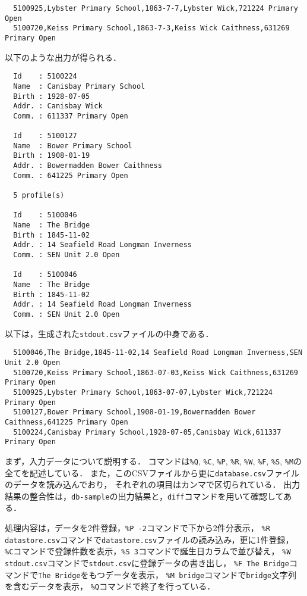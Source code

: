 \documentclass[autodetect-engine,dvi=dvipdfmx,ja=standard,
               a4j,11pt]{bxjsarticle}
\begin{document}
{\fontsize{10pt}{11pt} \selectfont
 \begin{verbatim}
  5100925,Lybster Primary School,1863-7-7,Lybster Wick,721224 Primary Open
  5100720,Keiss Primary School,1863-7-3,Keiss Wick Caithness,631269 Primary Open
 \end{verbatim}
}

\noindent
以下のような出力が得られる．

{\fontsize{10pt}{11pt} \selectfont
 \begin{verbatim}
  Id    : 5100224
  Name  : Canisbay Primary School
  Birth : 1928-07-05
  Addr. : Canisbay Wick
  Comm. : 611337 Primary Open

  Id    : 5100127
  Name  : Bower Primary School
  Birth : 1908-01-19
  Addr. : Bowermadden Bower Caithness
  Comm. : 641225 Primary Open

  5 profile(s)

  Id    : 5100046
  Name  : The Bridge
  Birth : 1845-11-02
  Addr. : 14 Seafield Road Longman Inverness
  Comm. : SEN Unit 2.0 Open

  Id    : 5100046
  Name  : The Bridge
  Birth : 1845-11-02
  Addr. : 14 Seafield Road Longman Inverness
  Comm. : SEN Unit 2.0 Open
 \end{verbatim}
}

\noindent
以下は，生成された\verb|stdout.csv|ファイルの中身である．

{\fontsize{10pt}{11pt} \selectfont
 \begin{verbatim}
  5100046,The Bridge,1845-11-02,14 Seafield Road Longman Inverness,SEN Unit 2.0 Open
  5100720,Keiss Primary School,1863-07-03,Keiss Wick Caithness,631269 Primary Open
  5100925,Lybster Primary School,1863-07-07,Lybster Wick,721224 Primary Open
  5100127,Bower Primary School,1908-01-19,Bowermadden Bower Caithness,641225 Primary Open
  5100224,Canisbay Primary School,1928-07-05,Canisbay Wick,611337 Primary Open
 \end{verbatim}
}

まず，入力データについて説明する．
コマンドは\verb|%Q|, \verb|%C|, \verb|%P|, \verb|%R|, \verb|%W|, \verb|%F|,
 \verb|%S|, \verb|%M|の全てを記述している．
また，このCSVファイルから更に\verb|database.csv|ファイルのデータを読み込んでおり，
それぞれの項目はカンマで区切られている．
出力結果の整合性は，\verb|db-sample|の出力結果と，\verb|diff|コマンドを用いて確認してある．

処理内容は，データを2件登録，\verb|%P -2|コマンドで下から2件分表示，
\verb|%R datastore.csv|コマンドで\verb|datastore.csv|ファイルの読み込み，更に1件登録，
\verb|%C|コマンドで登録件数を表示，\verb|%S 3|コマンドで誕生日カラムで並び替え，
\verb|%W stdout.csv|コマンドで\verb|stdout.csv|に登録データの書き出し，
\verb|%F The Bridge|コマンドで\verb|The Bridge|をもつデータを表示，
\verb|%M bridge|コマンドで\verb|bridge|文字列を含むデータを表示，
\verb|%Q|コマンドで終了を行っている．
\end{document}
